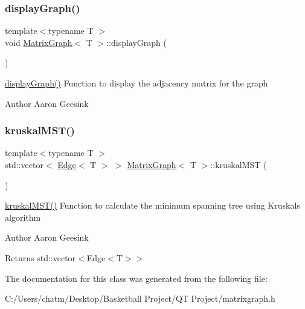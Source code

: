 \subsubsection{\texorpdfstring{displayGraph()}{displayGraph()}}
{\footnotesize\ttfamily template$<$typename T $>$ \\
void \mbox{\hyperlink{class_matrix_graph}{Matrix\+Graph}}$<$ T $>$\+::display\+Graph (\begin{DoxyParamCaption}{ }\end{DoxyParamCaption})\hspace{0.3cm}{\ttfamily [inline]}}



\mbox{\hyperlink{class_matrix_graph_ab77cb8ae78964112e9af1af96614f21a}{display\+Graph()}} Function to display the adjacency matrix for the graph 

\begin{DoxyAuthor}{Author}
Aaron Geesink 
\end{DoxyAuthor}
\mbox{\label{class_matrix_graph_ae83e60b9abc197b2959481d25555e9af}} 
\subsubsection{\texorpdfstring{kruskalMST()}{kruskalMST()}}
{\footnotesize\ttfamily template$<$typename T $>$ \\
std\+::vector$<$ \mbox{\hyperlink{struct_edge}{Edge}}$<$ T $>$ $>$ \mbox{\hyperlink{class_matrix_graph}{Matrix\+Graph}}$<$ T $>$\+::kruskal\+M\+ST (\begin{DoxyParamCaption}{ }\end{DoxyParamCaption})\hspace{0.3cm}{\ttfamily [inline]}}



\mbox{\hyperlink{class_matrix_graph_ae83e60b9abc197b2959481d25555e9af}{kruskal\+M\+S\+T()}} Function to calculate the minimum spanning tree using Kruskal\textquotesingle{}s algorithm 

\begin{DoxyAuthor}{Author}
Aaron Geesink 
\end{DoxyAuthor}
\begin{DoxyReturn}{Returns}
std\+::vector$<$Edge$<$\+T$>$$>$ 
\end{DoxyReturn}


The documentation for this class was generated from the following file\+:\begin{DoxyCompactItemize}
\item 
C\+:/\+Users/chatm/\+Desktop/\+Basketball Project/\+Q\+T Project/matrixgraph.\+h\end{DoxyCompactItemize}
